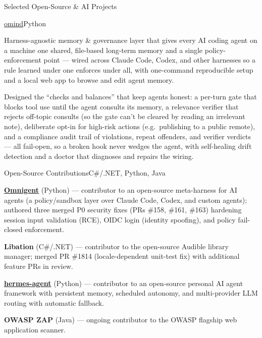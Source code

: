\documentclass{resume} %
\begin{document}
\begin{rSection}{Selected Open-Source \& AI Projects}
\begin{rSubsection}{\href{https://github.com/CryptoJones/omind}{omind}}{Python}{}{}
\item Harness-agnostic memory \& governance layer that gives every AI coding agent on a machine one shared, file-based long-term memory and a single policy-enforcement point --- wired across Claude Code, Codex, and other harnesses so a rule learned under one enforces under all, with one-command reproducible setup and a local web app to browse and edit agent memory.
\item Designed the ``checks and balances'' that keep agents honest: a per-turn gate that blocks tool use until the agent consults its memory, a relevance verifier that rejects off-topic consults (so the gate can't be cleared by reading an irrelevant note), deliberate opt-in for high-risk actions (e.g.\ publishing to a public remote), and a compliance audit trail of violations, repeat offenders, and verifier verdicts --- all fail-open, so a broken hook never wedges the agent, with self-healing drift detection and a doctor that diagnoses and repairs the wiring.
\end{rSubsection}

\begin{rSubsection}{Open-Source Contributions}{C\#/.NET, Python, Java}{}{}
\item {\bf \href{https://github.com/omnigent-ai/omnigent}{Omnigent}} (Python) --- contributor to an open-source meta-harness for AI agents (a policy/sandbox layer over Claude Code, Codex, and custom agents); authored three merged P0 security fixes (PRs \#158, \#161, \#163) hardening session input validation (RCE), OIDC login (identity spoofing), and policy fail-closed enforcement.
\item {\bf \textcolor{accent}{Libation}} (C\#/.NET) --- contributor to the open-source Audible library manager; merged PR \#1814 (locale-dependent unit-test fix) with additional feature PRs in review.
\item {\bf \href{https://github.com/CryptoJones/hermes-agent}{hermes-agent}} (Python) --- contributor to an open-source personal AI agent framework with persistent memory, scheduled autonomy, and multi-provider LLM routing with automatic fallback.
\item {\bf \textcolor{accent}{OWASP ZAP}} (Java) --- ongoing contributor to the OWASP flagship web application scanner.
\end{rSubsection}

\end{rSection}
\end{document}
